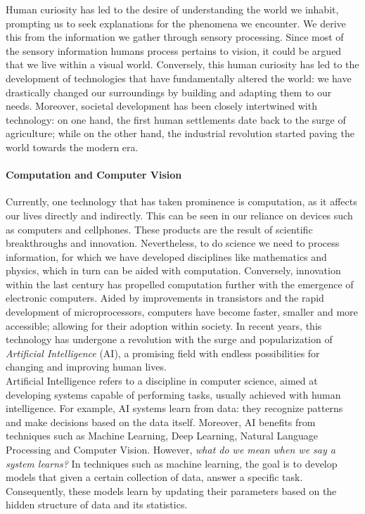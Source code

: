 Human curiosity has led to the desire of understanding the world we inhabit, prompting us to seek
explanations for the phenomena we encounter. We derive this from the information we gather through 
sensory processing. Since most of the sensory information humans process pertains 
to vision, it could be argued that we live within a visual world. Conversely, this human curiosity 
has led to the development of technologies that have fundamentally altered the world: we have 
drastically changed our surroundings by building and adapting them to our needs. Moreover, societal 
development has been closely intertwined with technology: on one hand, the first human settlements 
date back to the surge of agriculture; while on the other hand, the industrial revolution started 
paving the world towards the modern era.\\

\paragraph{Computation and Computer Vision} Currently, one technology that has taken prominence is 
computation, as it affects our lives directly and indirectly. This can be seen in our reliance on 
devices such as computers and  cellphones. These products are the result of scientific breakthroughs 
and innovation. Nevertheless, to do science we need to process information, for which we have 
developed disciplines like mathematics and physics, which in turn can be aided with computation. 
Conversely, innovation within the last century has propelled computation further with the emergence 
of electronic computers. Aided by improvements in transistors and the rapid development of 
microprocessors, computers have become faster, smaller and more accessible; allowing for their 
adoption within society. In recent years, this technology has undergone a revolution with the surge 
and popularization of \emph{Artificial Intelligence} (AI), a promising field with endless 
possibilities for changing and improving human lives.\\

\noindent Artificial Intelligence refers to a discipline in computer science, aimed at developing 
systems capable of performing tasks, usually achieved with human intelligence. For example, AI 
systems learn from data: they recognize patterns and make decisions based on the data itself. 
Moreover, AI benefits from techniques such as Machine Learning, Deep Learning, Natural Language 
Processing and Computer Vision. However, \emph{what do we mean when we say a system learns?} In 
techniques such as machine learning, the goal is to develop models that given a certain collection 
of data, answer a specific task. Consequently, these models learn by updating their parameters 
based on the hidden structure of data and its statistics.\\

